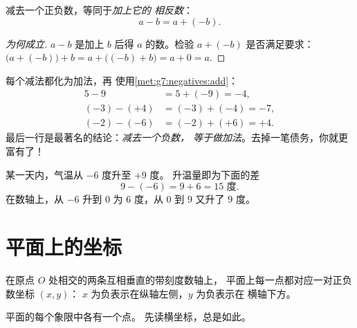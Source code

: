 \begin{theorem}[减法法则]\label{thm:g7:negatives:sub}
减去一个正负数，等同于\emph{加上它的
相反数}：
\[
a - b = a + (-b) .
\]
\end{theorem}

\begin{proof}[为何成立]
$a - b$ 是加上 $b$ 后得 $a$ 的数。检验
$a + (-b)$ 是否满足要求：
$\bigl(a + (-b)\bigr) + b = a + \bigl((-b) + b\bigr) = a + 0 = a$.
\end{proof}

\begin{example}\label{ex:g7:negatives:sub}
每个减法都化为加法，再
使用\cref{met:g7:negatives:add}：
\begin{align*}
5 - 9 &= 5 + (-9) = -4, \\
(-3) - (+4) &= (-3) + (-4) = -7, \\
(-2) - (-6) &= (-2) + (+6) = +4 .
\end{align*}
最后一行是最著名的结论：\emph{减去一个负数，
等于做加法}。去掉一笔债务，你就更富有了！
\end{example}

\begin{example}[温差]\label{ex:g7:negatives:temperature}
某一天内，气温从 $-6$ 度升至 $+9$ 度。
升温量即为下面的差
\[
9 - (-6) = 9 + 6 = 15 \text{ 度}.
\]
在数轴上，从 $-6$ 升到 $0$ 为 $6$ 度，从 $0$ 到
$9$ 又升了 $9$ 度。
\end{example}

\section{平面上的坐标}

\begin{definition}[带符号的坐标]\label{def:g7:negatives:coords}
在原点 $O$ 处相交的两条互相垂直的带刻度数轴上，
平面上每一点都对应一对正负数坐标 $(x, y)$：
$x$ 为负表示在纵轴左侧，$y$ 为负表示在
横轴下方。
\end{definition}

\begin{omfigure}

{\small 平面的每个象限中各有一个点。
先读横坐标，总是如此。}
\end{omfigure}

